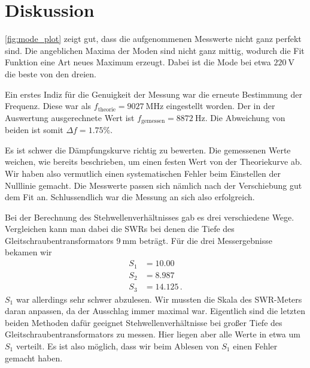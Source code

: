 \section{Diskussion}
\label{sec:Diskussion}

\autoref{fig:mode_plot} zeigt gut, dass die aufgenommenen Messwerte nicht ganz perfekt sind.
Die angeblichen Maxima der Moden sind nicht ganz mittig, wodurch die Fit Funktion eine Art neues Maximum erzeugt.
Dabei ist die Mode bei etwa $\SI{220}{\volt}$ die beste von den dreien.

Ein erstes Indiz für die Genuigkeit der Messung war die erneute Bestimmung der Frequenz.
Diese war als $f_\text{theorie} = \SI{9027}{\mega\hertz}$ eingestellt worden. 
Der in der Auswertung ausgerechnete Wert ist $f_\text{gemessen} = \SI{8872}{\hertz}$.
Die Abweichung von beiden ist somit $\Delta f = 1.75 \%$.

Es ist schwer die Dämpfungskurve richtig zu bewerten.
Die gemessenen Werte weichen, wie bereits beschrieben, um einen festen Wert von der Theoriekurve ab.
Wir haben also vermutlich einen systematischen Fehler beim Einstellen der Nulllinie gemacht.
Die Messwerte passen sich nämlich nach der Verschiebung gut dem Fit an.
Schlussendlich war die Messung an sich also erfolgreich.

Bei der Berechnung des Stehwellenverhältnisses gab es drei verschiedene Wege.
Vergleichen kann man dabei die SWRs bei denen die Tiefe des Gleitschraubentransformators $\SI{9}{\milli\meter}$ beträgt.
Für die drei Messergebnisse bekamen wir 
\begin{align*}
    S_1 &= \num{10.00} \\
    S_2 &= \num{8.987} \\
    S_3 &= \num{14.125} \, .
\end{align*}
$S_1$ war allerdings sehr schwer abzulesen. 
Wir mussten die Skala des SWR-Meters daran anpassen, da der Ausschlag immer maximal war.
Eigentlich sind die letzten beiden Methoden dafür geeignet Stehwellenverhältnisse bei großer Tiefe des Gleitschraubentransformators zu messen.
Hier liegen aber alle Werte in etwa um $S_1$ verteilt. 
Es ist also möglich, dass wir beim Ablesen von $S_1$ einen Fehler gemacht haben.